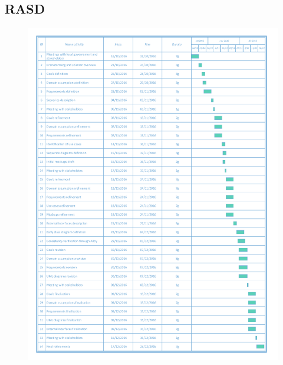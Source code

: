 \documentclass[english]{article}
\begin{document}
	\subsection{RASD}
		\begin{figure}[H]
			\centering
			\includegraphics[scale=0.55]{./Images/1-RasdGantt.pdf} 
		\end{figure}
\end{document}

